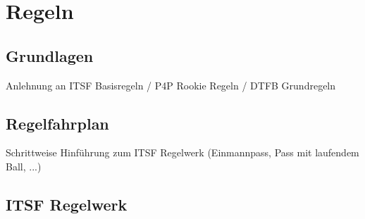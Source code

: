\chapter{Regeln}
\label{regeln}


\section{Grundlagen}
Anlehnung an ITSF Basisregeln / P4P Rookie Regeln / DTFB Grundregeln
\section{Regelfahrplan}
Schrittweise Hinführung zum ITSF Regelwerk (Einmannpass, Pass mit laufendem Ball, ...)
\section{ITSF Regelwerk}


